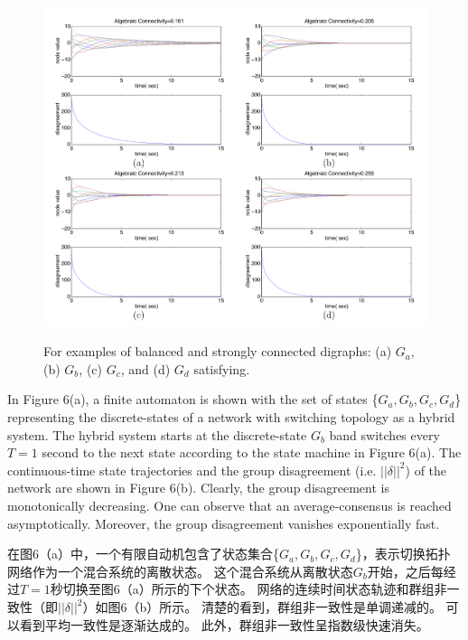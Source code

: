 \documentclass{article}
\begin{document}
\begin{figure}[htbp]
    \centering
    \includegraphics[width=14.5cm]{figures/Fig5-Simulation.jpeg}
    \label{Simulation}
    \caption{For examples of balanced and strongly connected digraphs: (a) $G_a$, (b) $G_b$, (c) $G_c$, and (d) $G_d$ satisfying.}
\end{figure}

{\color[gray]{0.5}
In Figure 6(a), a ﬁnite automaton is shown with the set of states \{$G_a, G_b, G_c, G_d$\} representing the discrete-states of a network with switching topology as a hybrid system. 
The hybrid system starts at the discrete-state $G_b$ band switches every $T=1$ second to the next state according to the state machine in Figure 6(a). 
The continuous-time state trajectories and the group disagreement (i.e. $||\delta||^2$) of the network are shown in Figure 6(b). 
Clearly, the group disagreement is monotonically decreasing. 
One can observe that an average-consensus is reached asymptotically. 
Moreover, the group disagreement vanishes exponentially fast.
}

在图6（a）中，一个有限自动机包含了状态集合\{$G_a, G_b, G_c, G_d$\}，表示切换拓扑网络作为一个混合系统的离散状态。
这个混合系统从离散状态$G_b$开始，之后每经过$T=1$秒切换至图6（a）所示的下个状态。
网络的连续时间状态轨迹和群组非一致性（即$||\delta||^2$）如图6（b）所示。
清楚的看到，群组非一致性是单调递减的。
可以看到平均一致性是逐渐达成的。
此外，群组非一致性呈指数级快速消失。
\end{document}
